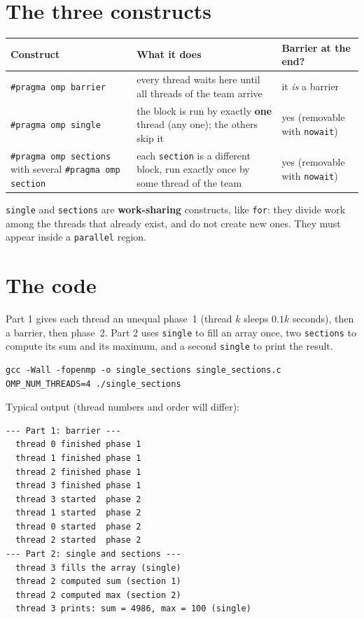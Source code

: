 \documentclass[11pt,a4paper]{article}
\begin{document}
\section{The three constructs}
\begin{center}
\small
\begin{tabular}{@{}>{\raggedright\arraybackslash}p{3.6cm}>{\raggedright\arraybackslash}p{7.6cm}>{\raggedright\arraybackslash}p{4.0cm}@{}}
\toprule
Construct & What it does & Barrier at the end? \\ \midrule
\texttt{\#pragma omp barrier} & every thread waits here until all threads of the team
  arrive & it \emph{is} a barrier \\
\texttt{\#pragma omp single} & the block is run by exactly \textbf{one} thread (any one);
  the others skip it & yes (removable with \texttt{nowait}) \\
\texttt{\#pragma omp sections} with several \texttt{\#pragma omp section} & each
  \texttt{section} is a different block, run exactly once by some thread of the team
  & yes (removable with \texttt{nowait}) \\
\bottomrule
\end{tabular}
\end{center}
\texttt{single} and \texttt{sections} are \textbf{work-sharing} constructs, like
\texttt{for}: they divide work among the threads that already exist, and do not create
new ones. They must appear inside a \texttt{parallel} region.

\section{The code}
Part 1 gives each thread an unequal phase~1 (thread $k$ sleeps $0.1k$ seconds), then a
barrier, then phase~2. Part 2 uses \texttt{single} to fill an array once, two
\texttt{sections} to compute its sum and its maximum, and a second \texttt{single} to
print the result.


\begin{lstlisting}[style=sh]
gcc -Wall -fopenmp -o single_sections single_sections.c
OMP_NUM_THREADS=4 ./single_sections
\end{lstlisting}
Typical output (thread numbers and order will differ):
\begin{lstlisting}[style=sh]
--- Part 1: barrier ---
  thread 0 finished phase 1
  thread 1 finished phase 1
  thread 2 finished phase 1
  thread 3 finished phase 1
  thread 3 started  phase 2
  thread 1 started  phase 2
  thread 0 started  phase 2
  thread 2 started  phase 2
--- Part 2: single and sections ---
  thread 3 fills the array (single)
  thread 2 computed sum (section 1)
  thread 2 computed max (section 2)
  thread 3 prints: sum = 4986, max = 100 (single)
\end{lstlisting}
\end{document}
